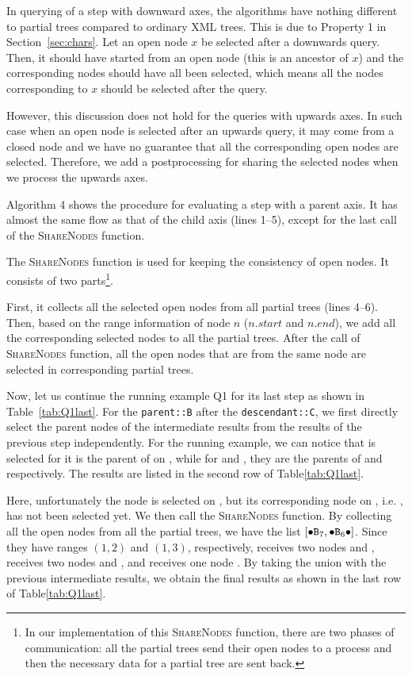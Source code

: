 In querying of a step with downward axes, the algorithms have nothing different
to partial trees compared to ordinary XML trees. This is due to Property 1 in
Section~\ref{sec:chars}. Let an open node $x$ be selected after a downwards
query. Then, it should have started from an open node (this is an ancestor of
$x$) and the corresponding nodes should have all been selected, which means all
the nodes corresponding to $x$ should be selected after the query.

However, this discussion does not hold for the queries with upwards axes. In
such case when an open node is selected after an upwards query, it may come
from a closed node and we have no guarantee that all the corresponding open
nodes are selected. Therefore, we add a postprocessing for sharing the selected
nodes when we process the upwards axes.

Algorithm 4 shows the procedure for evaluating a step with a parent axis.
It has almost the same flow as that of the child axis (lines 1--5),
except for the last call of the \textsc{ShareNodes} function.

The \textsc{ShareNodes} function is used for keeping the consistency of open
nodes. It consists of two parts\footnote{In our implementation of this
\textsc{ShareNodes} function, there are two phases of communication: all the
partial trees send their open nodes to a process and then the necessary data for
a partial tree are sent back.}.

First, it collects all the selected open nodes from all partial trees (lines
4--6). Then, based on the range information of node $n$ ($n.\mathit{start}$ and
$n.\mathit{end}$), we add all the corresponding selected nodes to all the
partial trees. After the call of \textsc{ShareNodes} function, all the open
nodes that are from the same node are selected in corresponding partial trees.

Now, let us continue the running example Q1 for its last step as shown in
Table~\ref{tab:Q1last}. For the \texttt{parent::B} after the
\texttt{descendant::C}, we first directly select the parent nodes of the
intermediate results from the results of the previous step independently. For
the running example, we can notice that  is selected for it is  the
parent of  on , while for  and , they are the
parents of  and  respectively.  The results are listed in
the second row of Table\ref{tab:Q1last}.

Here, unfortunately the node  is selected on , but its
corresponding node on , i.e. , has not been selected yet.  We then
call the \textsc{ShareNodes} function. By collecting all the open nodes from all
the partial trees, we have the list $[\hbox{$\bullet$\texttt{B$_{7}$}}, \hbox{$\bullet$\texttt{B$_{6}$}$\bullet$}]$. Since they have
ranges $(1, 2)$ and $(1, 3)$, respectively,  receives two nodes 
and ,  receives two nodes  and , and 
receives one node . By taking the union with the previous intermediate
results, we obtain the final results as shown in the last row of
Table\ref{tab:Q1last}.

